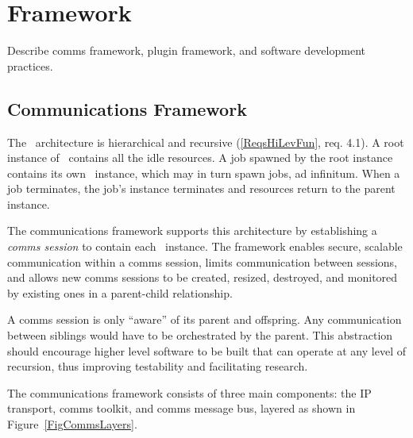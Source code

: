 \section{Framework}

Describe comms framework, plugin framework, and software
development practices.

\subsection{Communications Framework}\label{SecComms}

The \ngrm\ architecture is hierarchical and recursive
(\ref{ReqsHiLevFun}, req. 4.1).
A root instance of \ngrm\ contains all the
idle resources.  A job spawned by the root instance contains
its own \ngrm\ instance, which may in turn spawn jobs, ad infinitum.
When a job terminates, the job's instance terminates and resources
return to the parent instance.

The communications framework supports this architecture by
establishing a {\em comms session} to contain each \ngrm\ instance.
The framework enables secure, scalable communication
within a comms session, limits communication between sessions,
and allows new comms sessions to be created, resized, destroyed,
and monitored by existing ones in a parent-child relationship.

A comms session is only ``aware'' of its parent and offspring.
Any communication between siblings would have to be orchestrated by
the parent.  This abstraction should encourage higher level software
to be built that can operate at any level of recursion, thus improving
testability and facilitating research.

The communications framework consists of three main components:
the IP transport, comms toolkit, and comms message bus, layered
as shown in Figure~\ref{FigCommsLayers}.

